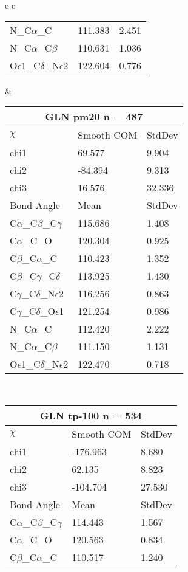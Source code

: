 \begin{longtable}{ c c }
\begin{tabular}{ l l l }
  N\_C$\alpha$\_C & 111.383 & 2.451\\
  N\_C$\alpha$\_C$\beta$ & 110.631 & 1.036\\
  O$\epsilon$1\_C$\delta$\_N$\epsilon$2 & 122.604 & 0.776\\
  \bottomrule
  \end{tabular}
  &
  \begin{tabular}{ l l l }
  \toprule
  \multicolumn{3}{c}{GLN \textbf{pm20} n = 487} \\ \toprule
  $\chi$       & Smooth COM & StdDev \\ \midrule
  chi1 & 69.577 & 9.904 \\ 
  chi2 & -84.394 & 9.313 \\ 
  chi3 & 16.576 & 32.336 \\ \midrule
  Bond Angle   & Mean     & StdDev \\ \midrule
  C$\alpha$\_C$\beta$\_C$\gamma$ & 115.686 & 1.408\\
  C$\alpha$\_C\_O & 120.304 & 0.925\\
  C$\beta$\_C$\alpha$\_C & 110.423 & 1.352\\
  C$\beta$\_C$\gamma$\_C$\delta$ & 113.925 & 1.430\\
  C$\gamma$\_C$\delta$\_N$\epsilon$2 & 116.256 & 0.863\\
  C$\gamma$\_C$\delta$\_O$\epsilon$1 & 121.254 & 0.986\\
  N\_C$\alpha$\_C & 112.420 & 2.222\\
  N\_C$\alpha$\_C$\beta$ & 111.150 & 1.131\\
  O$\epsilon$1\_C$\delta$\_N$\epsilon$2 & 122.470 & 0.718\\
  \bottomrule
  \end{tabular}
  \\
  \begin{tabular}{ l l l }
  \toprule
  \multicolumn{3}{c}{GLN \textbf{tp-100} n = 534} \\ \toprule
  $\chi$       & Smooth COM & StdDev \\ \midrule
  chi1 & -176.963 & 8.680 \\ 
  chi2 & 62.135 & 8.823 \\ 
  chi3 & -104.704 & 27.530 \\ \midrule
  Bond Angle   & Mean     & StdDev \\ \midrule
  C$\alpha$\_C$\beta$\_C$\gamma$ & 114.443 & 1.567\\
  C$\alpha$\_C\_O & 120.563 & 0.834\\
  C$\beta$\_C$\alpha$\_C & 110.517 & 1.240\\

\end{tabular}
\end{longtable}
